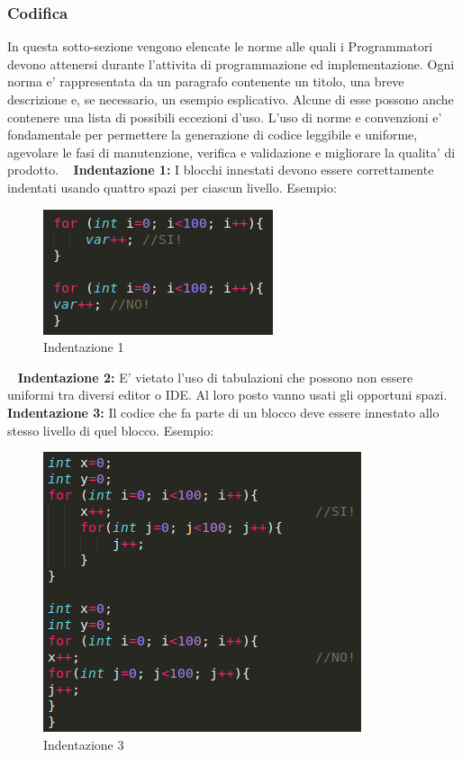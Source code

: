 	    \subsubsection{Codifica}
	In  questa  sotto-sezione  vengono  elencate  le  norme   alle  quali  i  Programmatori  devono attenersi durante l’attivita di programmazione ed implementazione. Ogni  norma e'  rappresentata  da  un  paragrafo contenente un titolo,  una breve descrizione e, se necessario, un esempio esplicativo.  Alcune di esse possono anche contenere una lista di possibili eccezioni d’uso. L’uso di norme e convenzioni e' fondamentale per permettere la generazione di codice leggibile e uniforme, agevolare le fasi di manutenzione,  verifica e validazione e migliorare la qualita' di prodotto. \newline
~\newline	
\textbf{Indentazione 1:} I blocchi innestati devono essere correttamente indentati usando quattro spazi per ciascun livello. \newline
	Esempio:\newline
	\begin{figure}[!htbp]
		\centering
		\includegraphics{indentazione1.png}
		\caption{Indentazione 1}
	\end{figure}
~\newline	
	\textbf{Indentazione 2:} E' vietato l'uso di tabulazioni che possono non essere uniformi tra diversi editor o IDE. Al loro posto vanno usati gli opportuni spazi. \newline
~\newline	
	\textbf{Indentazione 3:} Il codice che fa parte di un blocco deve essere innestato allo stesso livello di quel blocco. \newline
	Esempio:\newline
	\begin{figure}[!htbp]
		\centering
		\includegraphics{indentazione3.png}
		\caption{Indentazione 3}
	\end{figure}
